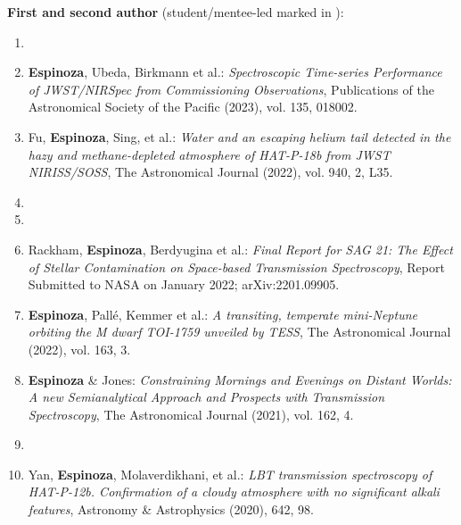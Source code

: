 \documentclass[12pt, a4paper]{article} %
\begin{document}
\begin{flushleft}%
  \setlength{\leftskip}{0.2cm}%
\textbf{First and second author} (student/mentee-led marked in {}):
\begin{enumerate}
\setlength\itemsep{0.05cm}

\item  {}
\item \textbf{Espinoza}, Ubeda, Birkmann et al.: \textit{Spectroscopic Time-series Performance of JWST/NIRSpec from Commissioning Observations}, Publications of the Astronomical Society of the Pacific (2023), vol. 135, 018002.
\item Fu, \textbf{Espinoza}, Sing, et al.: \textit{Water and an escaping helium tail detected in the hazy and methane-depleted atmosphere of HAT-P-18b from JWST NIRISS/SOSS}, The Astronomical Journal (2022), vol. 940, 2, L35.
\item  {}
\item  {}
\item Rackham, \textbf{Espinoza}, Berdyugina et al.: \textit{Final Report for SAG 21: The Effect of Stellar Contamination on Space-based Transmission Spectroscopy}, Report Submitted to NASA on January 2022; arXiv:2201.09905.
\item \textbf{Espinoza}, Pall\'e, Kemmer et al.: \textit{A transiting, temperate mini-Neptune orbiting the M dwarf TOI-1759 unveiled by TESS}, The Astronomical Journal (2022), vol. 163, 3.
\item \textbf{Espinoza} \& Jones: \textit{Constraining Mornings and Evenings on Distant Worlds: A new Semianalytical Approach and Prospects with Transmission Spectroscopy}, The Astronomical Journal (2021), vol. 162, 4.
\item  {}
\item Yan, \textbf{Espinoza}, Molaverdikhani, et al.: \textit{LBT transmission spectroscopy of HAT-P-12b. Confirmation of a cloudy atmosphere with no significant alkali features}, Astronomy \& Astrophysics (2020), 642, 98.

\end{enumerate}
\end{flushleft}
\end{document}
